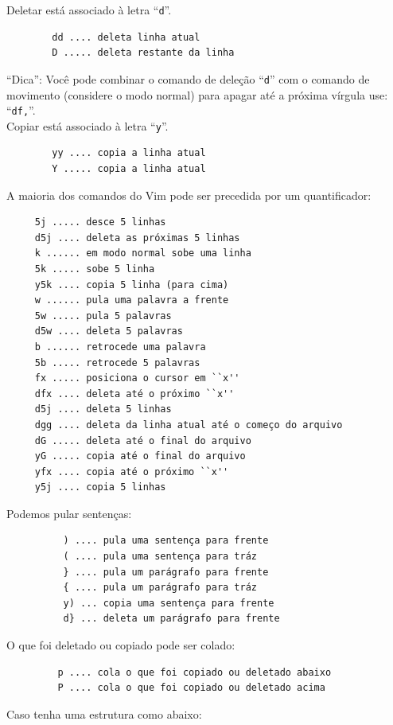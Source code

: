 \documentclass[10pt,a4paper,openany]{book}
\begin{document}
Deletar está associado à letra ``\verb|d|''.

\begin{verbatim}
		dd .... deleta linha atual
		D ..... deleta restante da linha
\end{verbatim}


``Dica'': Você pode combinar o comando de deleção ``\verb+d+'' com o
comando de movimento (considere o modo normal) para apagar até a
próxima vírgula use: ``\verb+df,+''. \\


Copiar está associado à letra ``\verb|y|''.

\begin{verbatim}
		yy .... copia a linha atual
		Y ..... copia a linha atual
\end{verbatim}

A maioria dos comandos do Vim pode ser precedida por um quantificador:

\begin{verbatim}
	 5j ..... desce 5 linhas
	 d5j .... deleta as próximas 5 linhas
	 k ...... em modo normal sobe uma linha
	 5k ..... sobe 5 linha
	 y5k .... copia 5 linha (para cima)
	 w ...... pula uma palavra a frente
	 5w ..... pula 5 palavras
	 d5w .... deleta 5 palavras
	 b ...... retrocede uma palavra
	 5b ..... retrocede 5 palavras
	 fx ..... posiciona o cursor em ``x''
	 dfx .... deleta até o próximo ``x''
	 d5j .... deleta 5 linhas
	 dgg .... deleta da linha atual até o começo do arquivo
	 dG ..... deleta até o final do arquivo
	 yG ..... copia até o final do arquivo
	 yfx .... copia até o próximo ``x''
	 y5j .... copia 5 linhas
\end{verbatim}

Podemos pular sentenças:

\begin{verbatim}
		  ) .... pula uma sentença para frente
		  ( .... pula uma sentença para tráz
		  } .... pula um parágrafo para frente
		  { .... pula um parágrafo para tráz
		  y) ... copia uma sentença para frente
		  d} ... deleta um parágrafo para frente
\end{verbatim}

O que foi deletado ou copiado pode ser colado:

\begin{verbatim}
		 p .... cola o que foi copiado ou deletado abaixo
		 P .... cola o que foi copiado ou deletado acima
\end{verbatim}

Caso tenha uma estrutura como abaixo:
\end{document}
